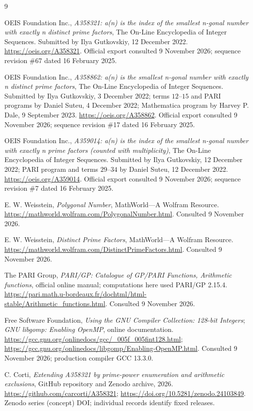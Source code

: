 \documentclass[11pt]{article}
\theoremstyle{remark}
\begin{document}
\clearpage
\begin{thebibliography}{9}
\sloppy\raggedright
{}
OEIS Foundation Inc., \emph{A358321: a(n) is the index of the smallest
n-gonal number with exactly n distinct prime factors},
The On-Line Encyclopedia of Integer Sequences.
Submitted by Ilya Gutkovskiy, 12 December 2022.
\url{https://oeis.org/A358321}.
Official export consulted 9 November 2026; sequence revision \#67 dated 16 February 2025.

OEIS Foundation Inc., \emph{A358862: a(n) is the smallest n-gonal number
with exactly n distinct prime factors},
The On-Line Encyclopedia of Integer Sequences.
Submitted by Ilya Gutkovskiy, 3 December 2022; terms $12$--$15$ and PARI
programs by Daniel Suteu, 4 December 2022; Mathematica program by
Harvey P. Dale, 9 September 2023.
\url{https://oeis.org/A358862}.
Official export consulted 9 November 2026; sequence revision \#17 dated 16 February 2025.

OEIS Foundation Inc., \emph{A359014: a(n) is the index of the smallest
n-gonal number with exactly n prime factors (counted with multiplicity)},
The On-Line Encyclopedia of Integer Sequences.
Submitted by Ilya Gutkovskiy, 12 December 2022; PARI program and terms
$29$--$34$ by Daniel Suteu, 12 December 2022.
\url{https://oeis.org/A359014}.
Official export consulted 9 November 2026; sequence revision \#7 dated 16 February 2025.

E. W. Weisstein, \emph{Polygonal Number}, MathWorld---A Wolfram Resource.
\url{https://mathworld.wolfram.com/PolygonalNumber.html}.
Consulted 9 November 2026.

E. W. Weisstein, \emph{Distinct Prime Factors}, MathWorld---A Wolfram Resource.
\url{https://mathworld.wolfram.com/DistinctPrimeFactors.html}.
Consulted 9 November 2026.

The PARI Group, \emph{PARI/GP: Catalogue of GP/PARI Functions,
Arithmetic functions}, official online manual; computations here used
PARI/GP 2.15.4.
\url{https://pari.math.u-bordeaux.fr/dochtml/html-stable/Arithmetic_functions.html}.
Consulted 9 November 2026.

Free Software Foundation, \emph{Using the GNU Compiler Collection:
128-bit Integers}; \emph{GNU libgomp: Enabling OpenMP}, online documentation.
\url{https://gcc.gnu.org/onlinedocs/gcc/_005f_005fint128.html};
\url{https://gcc.gnu.org/onlinedocs/libgomp/Enabling-OpenMP.html}.
Consulted 9 November 2026; production compiler GCC 13.3.0.

C. Corti, \emph{Extending A358321 by prime-power enumeration and arithmetic exclusions},
GitHub repository and Zenodo archive, 2026.
\url{https://github.com/carcorti/A358321};
\url{https://doi.org/10.5281/zenodo.24103849}.
Zenodo series (concept) DOI; individual records identify fixed releases.
\end{thebibliography}
\end{document}

